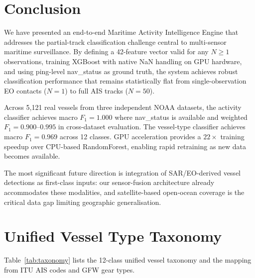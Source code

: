 \documentclass[journal]{IEEEtran}
\begin{document}
\section{Conclusion}
\label{sec:conclusion}

We have presented an end-to-end Maritime Activity Intelligence Engine that
addresses the partial-track classification challenge central to
multi-sensor maritime surveillance. By defining a 42-feature vector valid
for any $N \geq 1$ observations, training XGBoost with native NaN handling
on GPU hardware, and using ping-level nav\_status as ground truth, the
system achieves robust classification performance that remains statistically
flat from single-observation EO contacts ($N=1$) to full AIS tracks
($N=50$).

Across 5,121 real vessels from three independent NOAA datasets, the
activity classifier achieves macro $F_1 = 1.000$ where nav\_status is
available and weighted $F_1 = 0.900$--$0.995$ in cross-dataset evaluation.
The vessel-type classifier achieves macro $F_1 = 0.969$ across 12 classes.
GPU acceleration provides a $22\times$ training speedup over CPU-based
RandomForest, enabling rapid retraining as new data becomes available.

The most significant future direction is integration of SAR/EO-derived vessel
detections as first-class inputs: our sensor-fusion architecture already
accommodates these modalities, and satellite-based open-ocean coverage is
the critical data gap limiting geographic generalisation.

\appendices

\section{Unified Vessel Type Taxonomy}
\label{app:taxonomy}

Table~\ref{tab:taxonomy} lists the 12-class unified vessel taxonomy and
the mapping from ITU AIS codes and GFW gear types.
\end{document}
